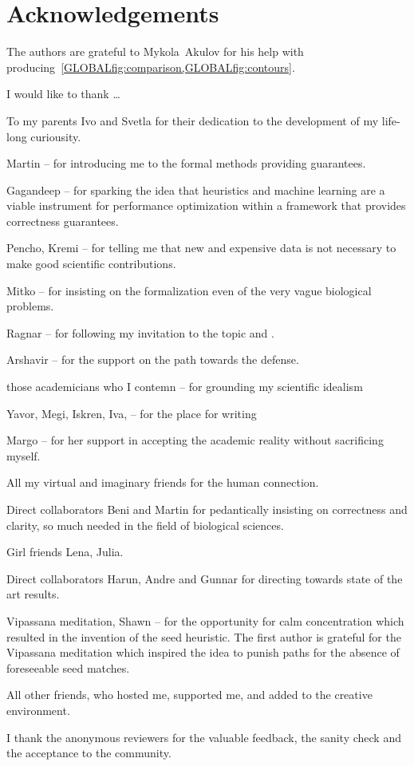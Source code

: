 
\bigskip

\begingroup
\let\clearpage\relax
\let\cleardoublepage\relax
\let\cleardoublepage\relax
\chapter*{Acknowledgements}

\def\thanks#1{%
\begingroup
\leftskip1em
\noindent #1
\par
\endgroup
}

The authors are grateful to Mykola~Akulov for his help with
producing~\cref{GLOBALfig:comparison,GLOBALfig:contours}.

I would like to thank \dots

To my parents Ivo and Svetla for their dedication to the development of my
life-long curiousity.

Martin -- for introducing me to the formal methods providing guarantees.

Gagandeep -- for sparking the idea that heuristics and machine learning are a
viable instrument for performance optimization within a framework that provides
correctness guarantees.

Pencho, Kremi -- for telling me that new and expensive data is not necessary to make
good scientific contributions.

Mitko -- for insisting on the formalization even of the very vague biological
problems.

Ragnar -- for following my invitation to the topic and .

Arshavir -- for the support on the path towards the defense.

those academicians who I contemn -- for grounding my scientific idealism 

Yavor, Megi, Iskren, Iva, -- for the place for writing

Margo -- for her support in accepting the academic reality without sacrificing myself.

All my virtual and imaginary friends for the human connection.

Direct collaborators Beni and Martin for pedantically insisting on correctness
and clarity, so much needed in the field of biological sciences.

Girl friends Lena, Julia.

Direct collaborators Harun, Andre and Gunnar for directing towards state of the art results.

Vipassana meditation, Shawn -- for the opportunity for calm concentration which
resulted in the invention of the seed heuristic. The first author is grateful
for the Vipassana meditation which inspired the idea to punish paths for the
absence of foreseeable seed matches.

All other friends, who hosted me, supported me, and added to the creative
environment.

I thank the anonymous reviewers for the valuable feedback, the sanity check and
the acceptance to the community. 

\endgroup
